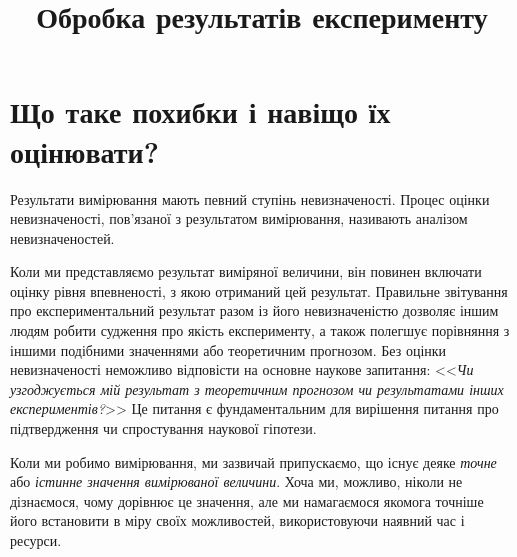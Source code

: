 \documentclass{LabBook}
\title{Обробка результатів експерименту}
\begin{document}
\maketitle
\tableofcontents
\clearpage
\pagestyle{main}


\chapter{Що таке похибки і навіщо їх оцінювати?}

Результати вимірювання мають певний ступінь невизначеності. Процес оцінки невизначеності, пов'язаної з результатом вимірювання, називають аналізом невизначеностей.

Коли ми представляємо результат виміряної величини, він повинен включати оцінку рівня впевненості, з якою отриманий цей результат. Правильне звітування про експериментальний результат разом із його невизначеністю дозволяє іншим людям робити судження про якість експерименту, а також полегшує порівняння з іншими подібними значеннями або теоретичним прогнозом. Без оцінки невизначеності неможливо відповісти на основне наукове запитання: <<\emph{Чи узгоджується мій результат з теоретичним прогнозом чи результатами інших експериментів?}>> Це питання є фундаментальним для вирішення питання про підтвердження чи спростування наукової гіпотези.

Коли ми робимо вимірювання, ми зазвичай припускаємо, що існує деяке \emph{точне} або \emph{істинне значення вимірюваної величини}. Хоча ми, можливо, ніколи не дізнаємося, чому дорівнює це значення, але ми намагаємося якомога точніше його встановити в  міру своїх можливостей, використовуючи наявний час і ресурси.

\end{document}
